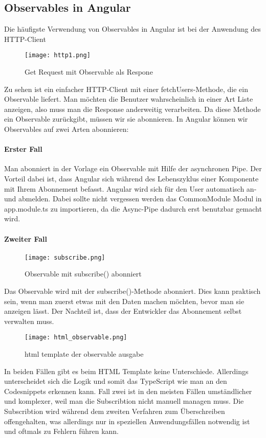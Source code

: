 \subsection{Observables in Angular}
Die häufigste Verwendung von Observables in Angular ist bei der Anwendung des HTTP-Client
\begin{figure}[H] \centering \texttt{[image: http1.png]} \caption{Get Request mit Observable als Respone} \end{figure}
Zu sehen ist ein einfacher HTTP-Client mit einer fetchUsers-Methode, die ein Observable liefert. Man möchten die Benutzer wahrscheinlich in einer Art Liste anzeigen, also muss man die Response anderweitig verarbeiten. Da diese Methode ein Observable zurückgibt, müssen wir sie abonnieren. In Angular können wir Observables auf zwei Arten abonnieren:
\paragraph{Erster Fall}
Man abonniert in der Vorlage ein Observable mit Hilfe der asynchronen Pipe. Der Vorteil dabei ist, dass Angular sich während des Lebenszyklus einer Komponente mit Ihrem Abonnement befasst. Angular wird sich für den User automatisch an- und abmelden. Dabei sollte nicht vergessen werden das CommonModule Modul in app.module.ts zu importieren, da die Async-Pipe dadurch erst benutzbar gemacht wird.
\paragraph{Zweiter Fall}
\begin{figure}[H] \centering \texttt{[image: subscribe.png]} \caption{Observable mit subscribe() abonniert} \end{figure}
Das Observable wird mit der subscribe()-Methode abonniert. Dies kann praktisch sein, wenn man zuerst etwas mit den Daten machen möchten, bevor man sie anzeigen lässt. Der Nachteil ist, dass der Entwickler das Abonnement selbst verwalten muss.
\begin{figure}[H] \centering \texttt{[image: html\_observable.png]} \caption{html template der observable ausgabe} \end{figure}
In beiden Fällen gibt es beim HTML Template keine Unterschiede. Allerdings unterscheidet sich die Logik und somit das TypeScript wie man an den Codesnippets erkennen kann. Fall zwei ist in den meisten Fällen umständlicher und komplexer, weil man die Subscribtion nicht manuell managen muss. Die Subscribtion wird während dem zweiten Verfahren zum Überschreiben offengehalten, was allerdings nur in speziellen Anwendungsfällen notwendig ist und oftmals zu Fehlern führen kann. 
